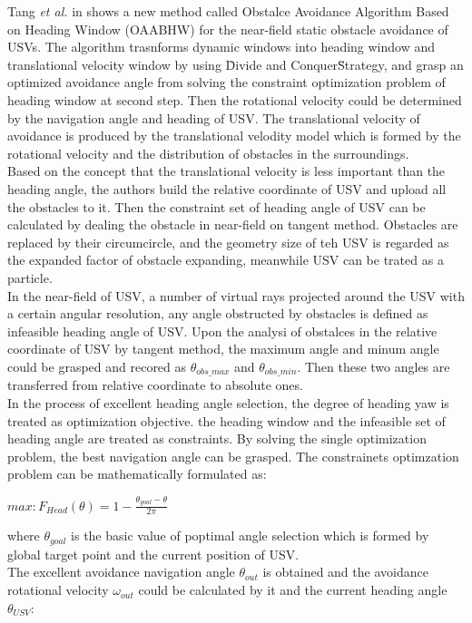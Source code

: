 \documentclass[journal]{IEEEtran}
\begin{document}
  Tang \textit{et al.} in \cite{Tang2012} shows a new method called Obstalce Avoidance Algorithm Based on Heading Window (OAABHW) for the near-field static obstacle avoidance of USVs. The algorithm trasnforms dynamic windows into heading window and translational velocity window by using \"Divide and Conquer\" Strategy, and grasp an optimized avoidance angle from solving the constraint optimization problem of heading window at second step. Then the rotational velocity could be determined by the navigation angle and heading of USV. The translational velocity of avoidance is produced by the translational velodity model which is formed by the rotational velocity and the distribution of obstacles in the surroundings.\\
  Based on the concept that the translational velocity is less important than the heading angle, the authors build the relative coordinate of USV and upload all the obstacles to it. Then the constraint set of heading angle of USV can be calculated by dealing the obstacle in near-field on tangent method. Obstacles are replaced by their circumcircle, and the geometry size of teh USV is regarded as the expanded factor of obstacle expanding, meanwhile USV can be trated as a particle.\\
  In the near-field of USV, a number of virtual rays projected around the USV with a certain angular resolution, any angle obstructed by obstacles is defined as infeasible heading angle of USV. Upon the analysi of obstalces in the relative coordinate of USV by tangent method, the maximum angle and minum angle could be grasped and recored as $\theta_{obs\_max}$ and $\theta_{obs\_min}$. Then these two angles are transferred from relative coordinate to absolute ones.\\
  In the process of excellent heading angle selection, the degree of heading yaw is treated as optimization objective. the heading window and the infeasible set of heading angle are treated as constraints. By solving the single optimization problem, the best navigation angle can be grasped. The constrainets optimzation problem can be mathematically formulated as:
      \begin{center}
            $max: F_{Head} (\theta) = 1 - \frac{\theta_{goal} - \theta}{2\pi}$
      \end{center}
  where $\theta_{goal}$ is the basic value of poptimal angle selection which is formed by global target point and the current position of USV.\\
  The excellent avoidance navigation angle $\theta_{out}$ is obtained and the avoidance rotational velocity $\omega_{out}$ could be calculated by it and the current heading angle $\theta_{USV}$:
\end{document}
